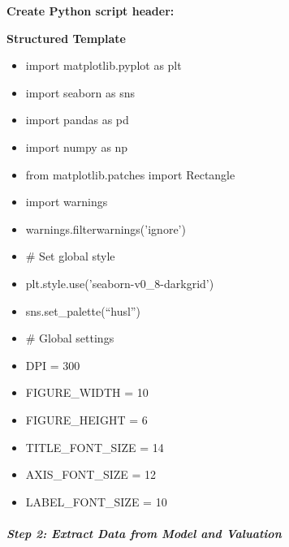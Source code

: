 \documentclass[11pt]{article}
\begin{document}
\textbf{Create Python script header:}

\textbf{Structured Template}
\begin{itemize}[leftmargin=*,itemsep=2pt,topsep=2pt]
\item {} import matplotlib.pyplot as plt
\item {} import seaborn as sns
\item {} import pandas as pd
\item {} import numpy as np
\item {} from matplotlib.patches import Rectangle
\item {} import warnings
\item {} warnings.filterwarnings('ignore')
\item {} \# Set global style
\item {} plt.style.use('seaborn-v0\_\allowbreak{}8-darkgrid')
\item {} sns.set\_\allowbreak{}palette(``husl'')
\item {} \# Global settings
\item {} DPI = 300
\item {} FIGURE\_\allowbreak{}WIDTH = 10
\item {} FIGURE\_\allowbreak{}HEIGHT = 6
\item {} TITLE\_\allowbreak{}FONT\_\allowbreak{}SIZE = 14
\item {} AXIS\_\allowbreak{}FONT\_\allowbreak{}SIZE = 12
\item {} LABEL\_\allowbreak{}FONT\_\allowbreak{}SIZE = 10
\end{itemize}

\subparagraph{Step 2: Extract Data from Model and Valuation}\mbox{}\par
\end{document}
